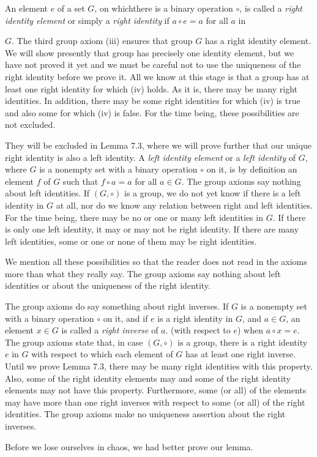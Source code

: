 \documentclass[11pt]{amsbook}
\begin{document}
\setcounter{page}{65}

An element $e$ of a set $G$, on whichthere is a binary operation $\circ$, is called
a \textit{right identity element} or simply a \textit{right identity} if $a \circ e = a$ for all $a$ in


$G$. The third group axiom (iii) ensures that group $G$ has a right identity
element. We will show presently that group has precisely one identity
element, but we have not proved it yet and we must be careful not to
use the uniqueness of the right identity before we prove it. All we know
at this stage is that a group has at least one right identity for which (iv)
holds. As it is, there may be many right identities. In addition, there
may be some right identities for which (iv) is true and also some for
which (iv) is false. For the time being, these possibilities are not
excluded. 

They will be excluded in Lemma 7.3, where we will prove further that
our unique right identity is also a left identity. A \textit{left identity element} or
a \textit{left identity} of $G$, where $G$ is a nonempty set with a binary operation $\circ$
on it, is by definition an element $f$ of $G$ such that $f \circ a = a$ for all $a \in G$.
The group axioms say nothing about left identities. If $(G, \circ)$ is a group,
we do not yet know if there is a left identity in $G$ at all, nor do we know
any relation between right and left identities. For the time being, there
may be no or one or many left identities in $G$. If there is only one left
identity, it may or may not be right identity. If there are many left
identities, some or one or none of them may be right identities. 

We mention all these possibilities so that the reader does not read in the
axioms more than what they really say. The group axioms say nothing
about left identities or about the uniqueness of the right identity. 

The group axioms do say something about right inverses. If $G$ is a
nonempty set with a binary operation $\circ$ on it, and if $e$ is a right identity
in $G$, and $a \in G$, an element $x \in G$ is called a \textit{right inverse} of $a$. (with
respect to $e$) when $a \circ x = e$. The group axioms state that, in case $(G, \circ)$ is
a group, there is a right identity $e$ in $G$ with respect to which each
element of $G$ has at least one right inverse. Until we prove Lemma 7.3,
there may be many right identities with this property. Also, some of the
right identity elements may and some of the right identity elements
may not have this property. Furthermore, some (or all) of the elements
may have more than one right inverses with respect to some (or all) of
the right identities. The group axioms make no uniqueness assertion
about the right inverses. 

Before we lose ourselves in chaos, we had better prove our lemma. 



\end{document}
